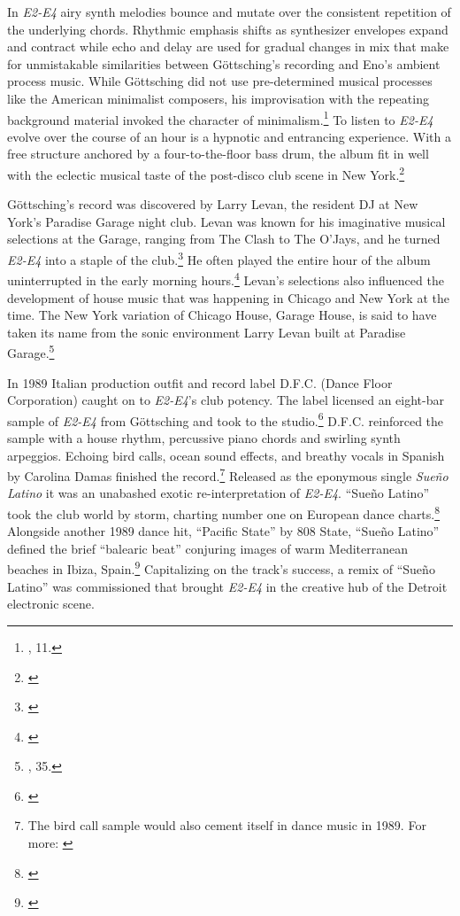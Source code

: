 \documentclass[12pt,twoside]{reedthesis}
\begin{document}
In \emph{E2-E4} airy synth melodies bounce and mutate over the consistent repetition of the underlying chords. Rhythmic emphasis shifts as synthesizer envelopes expand and contract while echo and delay are used for gradual changes in mix that make for unmistakable similarities between G{\"o}ttsching's recording and Eno's ambient process music. While G{\"o}ttsching did not use pre-determined musical processes like the American minimalist composers, his improvisation with the repeating background material invoked the character of minimalism.\footnote{\cite{reichWritingsMusic1974}, 11.} To listen to \emph{E2-E4} evolve over the course of an hour is a hypnotic and entrancing experience. With a free structure anchored by a four-to-the-floor bass drum, the album fit in well with the eclectic musical taste of the post-disco club scene in New York.\footnote{\cite{lawrenceSaturdayMassLarry2014}}

G{\"o}ttsching's record was discovered by Larry Levan, the resident DJ at New York's Paradise Garage night club. Levan was known for his imaginative musical selections at the Garage, ranging from The Clash to The O'Jays, and he turned \emph{E2-E4} into a staple of the club.\footnote{\cite{lawrenceSaturdayMassLarry2014}} He often played the entire hour of the album uninterrupted in the early morning hours.\footnote{\cite{d.straussManuelGottsching2006}} Levan's selections also influenced the development of house music that was happening in Chicago and New York at the time. The New York variation of Chicago House, Garage House, is said to have taken its name from the sonic environment Larry Levan built at Paradise Garage.\footnote{\cite{reynoldsGenerationEcstasyWorld1998}, 35.}   

In 1989 Italian production outfit and record label D.F.C. (Dance Floor Corporation) caught on to \emph{E2-E4}'s club potency. The label licensed an eight-bar sample of \emph{E2-E4} from G{\"o}ttsching and took to the studio.\footnote{\cite{d.straussManuelGottsching2006}} D.F.C. reinforced the sample with a house rhythm, percussive piano chords and swirling synth arpeggios. Echoing bird calls, ocean sound effects, and breathy vocals in Spanish by Carolina Damas finished the record.\footnote{The bird call sample would also cement itself in dance music in 1989. For more: \cite{sherburneAnacondaPacificState2014}} Released as the eponymous single \emph{Sue{\~n}o Latino} it was an unabashed exotic re-interpretation of \emph{E2-E4}. ``Sue{\~n}o Latino'' took the club world by storm, charting number one on European dance charts.\footnote{\cite{d.straussManuelGottsching2006}} Alongside another 1989 dance hit, ``Pacific State'' by 808 State, ``Sue{\~n}o Latino'' defined the brief ``balearic beat'' conjuring images of warm Mediterranean beaches in Ibiza, Spain.\footnote{\cite{brewsterbillSearchBalearic2008}} Capitalizing on the track's success, a remix of ``Sue{\~n}o Latino'' was commissioned that brought \emph{E2-E4} in the creative hub of the Detroit electronic scene.
\end{document}
